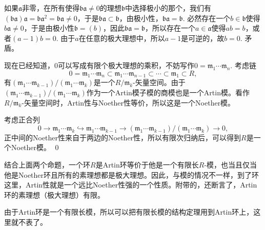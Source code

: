 	如果$\mathfrak{a}$非零，在所有使得$\mathfrak{b}\mathfrak{a}\neq 0$的理想$\mathfrak{b}$中选择极小的那个，我们有$(\mathfrak{b}\mathfrak{a})\mathfrak{a}=\mathfrak{b}\mathfrak{a}^2=\mathfrak{b}\mathfrak{a}\neq 0$，于是$\mathfrak{b}\mathfrak{a}\subset \mathfrak{b}$，由极小性，$\mathfrak{b}\mathfrak{a}=\mathfrak{b}$. 必然存在一个$b\in\mathfrak{b}$使得$b\mathfrak{a}\neq 0$，于是由极小性$\mathfrak{b}=(b)$，因此$\mathfrak{b}\mathfrak{a}=\mathfrak{b}$，所以存在一个$a\in \mathfrak{a}$使得$ab=b$，或者$(a-1)b=0$. 由于$a$在任意的极大理想中，所以$a-1$是可逆的，故$b=0$. 矛盾。

	现在已经知道，$0$可以写成有限个极大理想的乘积，不妨写作$0=\mathfrak{m}_1\cdots \mathfrak{m}_n$. 考虑链
	\[
	0=\mathfrak{m}_1\cdots \mathfrak{m}_n\subset \mathfrak{m}_1\cdots \mathfrak{m}_{n-1}\subset \cdots\subset \mathfrak{m}_1\subset R,
	\]
	有$(\mathfrak{m}_1\cdots \mathfrak{m}_{k-1})/(\mathfrak{m}_1\cdots \mathfrak{m}_{k})$是一个$R/\mathfrak{m}_{k}$-矢量空间。由于$(\mathfrak{m}_1\cdots \mathfrak{m}_{k-1})/(\mathfrak{m}_1\cdots \mathfrak{m}_{k})$作为一个Artin模子模的商模也是一个Artin模。看作$R/\mathfrak{m}_{k}$-矢量空间时，Artin性与Noether性等价，所以这是一个Noether模。

	考虑正合列
	\[
	0\to \mathfrak{m}_1\cdots \mathfrak{m}_{k}\hookrightarrow\mathfrak{m}_1\cdots \mathfrak{m}_{k-1}\to (\mathfrak{m}_1\cdots \mathfrak{m}_{k-1})/(\mathfrak{m}_1\cdots \mathfrak{m}_{k})\to 0,
	\]
	正中间的Noether性来自于两边的Noether性，所以有限次归纳后，可以得到$R$是一个Noether模。
\qed

\para 结合上面两个命题，一个环$R$是Artin环等价于他是一个有限长$R$-模，也当且仅当他是Noether环且所有的素理想都是极大理想。因此，与模的情况不一样，到了环这里，Artin性就是一个远比Noether性强的一个性质。附带的，还断言了，Artin环的素理想（极大理想）有限。

由于Artin环是一个有限长模，所以可以把有限长模的结构定理用到Artin环上，这里就不表了。
